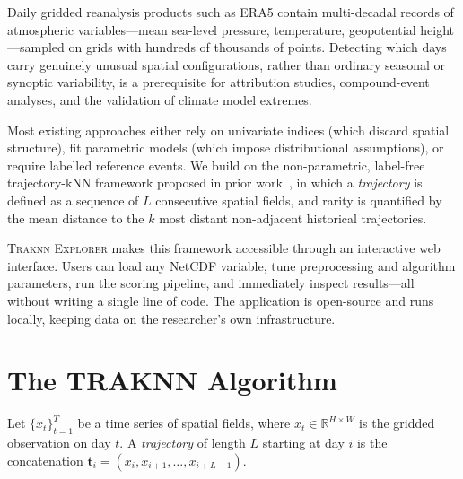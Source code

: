\documentclass[runningheads]{llncs}
\begin{document}
Daily gridded reanalysis products such as ERA5 contain multi-decadal records
of atmospheric variables—mean sea-level pressure, temperature, geopotential
height—sampled on grids with hundreds of thousands of points.
Detecting which days carry genuinely unusual spatial configurations, rather than
ordinary seasonal or synoptic variability, is a prerequisite for attribution
studies, compound-event analyses, and the validation of climate model extremes.

Most existing approaches either rely on univariate indices (which discard
spatial structure), fit parametric models (which impose distributional
assumptions), or require labelled reference events.
We build on the non-parametric, label-free trajectory-kNN framework
proposed in prior work~\cite{placeholder}, in which a \emph{trajectory}
is defined as a sequence of $L$ consecutive spatial fields, and rarity is
quantified by the mean distance to the $k$ most distant non-adjacent
historical trajectories.

\textsc{Traknn Explorer} makes this framework accessible through an
interactive web interface.
Users can load any NetCDF variable, tune preprocessing and algorithm
parameters, run the scoring pipeline, and immediately inspect results—all
without writing a single line of code.
The application is open-source and runs locally, keeping data on the
researcher's own infrastructure.

\section{The TRAKNN Algorithm}
\label{sec:algo}

Let $\{x_t\}_{t=1}^{T}$ be a time series of spatial fields, where
$x_t \in \mathbb{R}^{H \times W}$ is the gridded observation on day $t$.
A \emph{trajectory} of length $L$ starting at day $i$ is the concatenation
$\mathbf{t}_i = (x_i, x_{i+1}, \ldots, x_{i+L-1})$.
\end{document}
